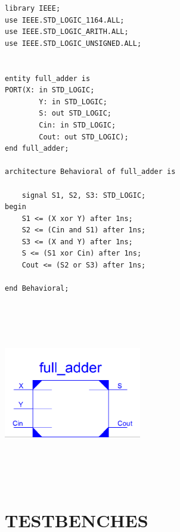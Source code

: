\documentclass{article}
\begin{document}
\begin{lstlisting}
library IEEE;
use IEEE.STD_LOGIC_1164.ALL;
use IEEE.STD_LOGIC_ARITH.ALL;
use IEEE.STD_LOGIC_UNSIGNED.ALL;


entity full_adder is
PORT(X: in STD_LOGIC;
		Y: in STD_LOGIC;
		S: out STD_LOGIC;
		Cin: in STD_LOGIC;
		Cout: out STD_LOGIC);
end full_adder;

architecture Behavioral of full_adder is

	signal S1, S2, S3: STD_LOGIC;
begin
	S1 <= (X xor Y) after 1ns;
	S2 <= (Cin and S1) after 1ns;
	S3 <= (X and Y) after 1ns;
	S <= (S1 xor Cin) after 1ns;
	Cout <= (S2 or S3) after 1ns;

end Behavioral;
\end{lstlisting}

\includegraphics[width=6cm, height=8cm]{adder.png}
\pagebreak

\section{TESTBENCHES}
\end{document}
